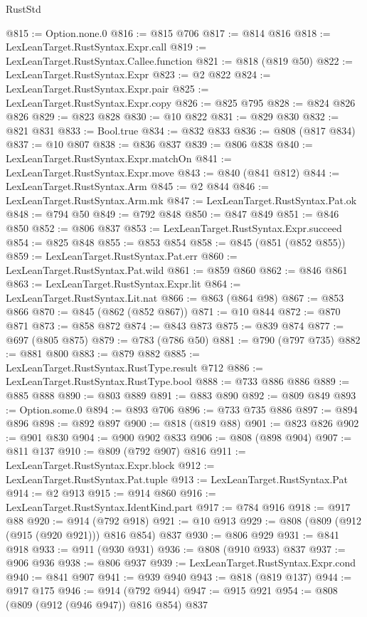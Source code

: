 \begin{lexlean}{RustStd}
\begin{coremodule}
@815 := Option.none.{0}
@816 := @815 @706
@817 := @814 @816
@818 := LexLeanTarget.RustSyntax.Expr.call
@819 := LexLeanTarget.RustSyntax.Callee.function
@821 := @818 (@819 @50)
@822 := LexLeanTarget.RustSyntax.Expr
@823 := @2 @822
@824 := LexLeanTarget.RustSyntax.Expr.pair
@825 := LexLeanTarget.RustSyntax.Expr.copy
@826 := @825 @795
@828 := @824 @826 @826
@829 := @823 @828
@830 := @10 @822
@831 := @829 @830
@832 := @821 @831
@833 := Bool.true
@834 := @832 @833
@836 := @808 (@817 @834)
@837 := @10 @807
@838 := @836 @837
@839 := @806 @838
@840 := LexLeanTarget.RustSyntax.Expr.matchOn
@841 := LexLeanTarget.RustSyntax.Expr.move
@843 := @840 (@841 @812)
@844 := LexLeanTarget.RustSyntax.Arm
@845 := @2 @844
@846 := LexLeanTarget.RustSyntax.Arm.mk
@847 := LexLeanTarget.RustSyntax.Pat.ok
@848 := @794 @50
@849 := @792 @848
@850 := @847 @849
@851 := @846 @850
@852 := @806 @837
@853 := LexLeanTarget.RustSyntax.Expr.succeed
@854 := @825 @848
@855 := @853 @854
@858 := @845 (@851 (@852 @855))
@859 := LexLeanTarget.RustSyntax.Pat.err
@860 := LexLeanTarget.RustSyntax.Pat.wild
@861 := @859 @860
@862 := @846 @861
@863 := LexLeanTarget.RustSyntax.Expr.lit
@864 := LexLeanTarget.RustSyntax.Lit.nat
@866 := @863 (@864 @98)
@867 := @853 @866
@870 := @845 (@862 (@852 @867))
@871 := @10 @844
@872 := @870 @871
@873 := @858 @872
@874 := @843 @873
@875 := @839 @874
@877 := @697 (@805 @875)
@879 := @783 (@786 @50)
@881 := @790 (@797 @735)
@882 := @881 @800
@883 := @879 @882
@885 := LexLeanTarget.RustSyntax.RustType.result @712
@886 := LexLeanTarget.RustSyntax.RustType.bool
@888 := @733 @886 @886
@889 := @885 @888
@890 := @803 @889
@891 := @883 @890
@892 := @809 @849
@893 := Option.some.{0}
@894 := @893 @706
@896 := @733 @735 @886
@897 := @894 @896
@898 := @892 @897
@900 := @818 (@819 @88)
@901 := @823 @826
@902 := @901 @830
@904 := @900 @902 @833
@906 := @808 (@898 @904)
@907 := @811 @137
@910 := @809 (@792 @907) @816
@911 := LexLeanTarget.RustSyntax.Expr.block
@912 := LexLeanTarget.RustSyntax.Pat.tuple
@913 := LexLeanTarget.RustSyntax.Pat
@914 := @2 @913
@915 := @914 @860
@916 := LexLeanTarget.RustSyntax.IdentKind.part
@917 := @784 @916
@918 := @917 @88
@920 := @914 (@792 @918)
@921 := @10 @913
@929 := @808 (@809 (@912 (@915 (@920 @921))) @816 @854) @837
@930 := @806 @929
@931 := @841 @918
@933 := @911 (@930 @931)
@936 := @808 (@910 @933) @837
@937 := @906 @936
@938 := @806 @937
@939 := LexLeanTarget.RustSyntax.Expr.cond
@940 := @841 @907
@941 := @939 @940
@943 := @818 (@819 @137)
@944 := @917 @175
@946 := @914 (@792 @944)
@947 := @915 @921
@954 := @808 (@809 (@912 (@946 @947)) @816 @854) @837

\end{coremodule}
\end{lexlean}
